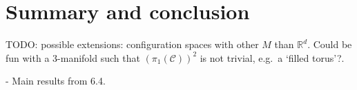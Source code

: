 \chapter{Summary and conclusion}

TODO: possible extensions: configuration spaces with other $M$ than $\mathbb{R}^d$. Could be fun with a 3-manifold such that $(\pi_1(\mathcal{C}))^2$ is not trivial, e.g.\ a `filled torus'?.

- Main results from 6.4.
